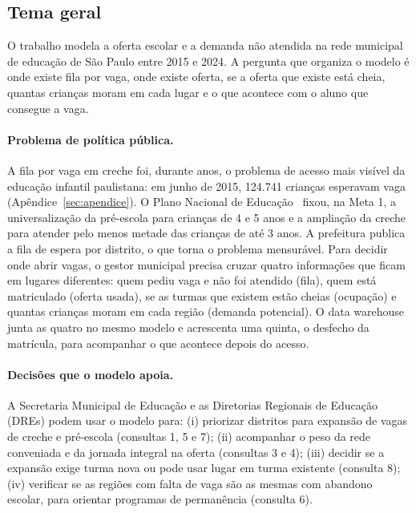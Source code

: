 \documentclass[11pt,a4paper]{article}
\begin{document}
\subsection{Tema geral}

O trabalho modela a oferta escolar e a demanda não atendida na rede municipal de educação de São Paulo entre 2015 e 2024. A pergunta que organiza o modelo é onde existe fila por vaga, onde existe oferta, se a oferta que existe está cheia, quantas crianças moram em cada lugar e o que acontece com o aluno que consegue a vaga.

\paragraph{Problema de política pública.} A fila por vaga em creche foi, durante anos, o problema de acesso mais visível da educação infantil paulistana: em junho de 2015, 124.741 crianças esperavam vaga (Apêndice~\ref{sec:apendice}). O Plano Nacional de Educação~\cite{pne} fixou, na Meta 1, a universalização da pré-escola para crianças de 4 e 5 anos e a ampliação da creche para atender pelo menos metade das crianças de até 3 anos. A prefeitura publica a fila de espera por distrito, o que torna o problema mensurável. Para decidir onde abrir vagas, o gestor municipal precisa cruzar quatro informações que ficam em lugares diferentes: quem pediu vaga e não foi atendido (fila), quem está matriculado (oferta usada), se as turmas que existem estão cheias (ocupação) e quantas crianças moram em cada região (demanda potencial). O data warehouse junta as quatro no mesmo modelo e acrescenta uma quinta, o desfecho da matrícula, para acompanhar o que acontece depois do acesso.

\paragraph{Decisões que o modelo apoia.} A Secretaria Municipal de Educação e as Diretorias Regionais de Educação (DREs) podem usar o modelo para: (i) priorizar distritos para expansão de vagas de creche e pré-escola (consultas 1, 5 e 7); (ii) acompanhar o peso da rede conveniada e da jornada integral na oferta (consultas 3 e 4); (iii) decidir se a expansão exige turma nova ou pode usar lugar em turma existente (consulta 8); (iv) verificar se as regiões com falta de vaga são as mesmas com abandono escolar, para orientar programas de permanência (consulta 6).
\end{document}
